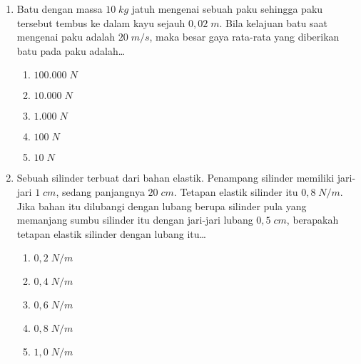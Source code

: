 \documentclass[A4,12PT, english, twocolumn]{journal}
\begin{document}
\begin{enumerate}
\item Batu dengan massa $10 \; kg$ jatuh mengenai sebuah paku sehingga paku tersebut tembus ke dalam kayu sejauh $0,02 \; m$. Bila kelajuan batu saat mengenai paku adalah $20 \; m/s$, maka besar gaya rata-rata yang diberikan batu pada paku adalah\dots
    \begin{enumerate}
        \item $100.000 \; N$
        \item $10.000 \; N$
        \item $1.000 \; N$
        \item $100 \; N$
        \item $10\; N$
    \end{enumerate}
   
\item Sebuah silinder terbuat dari bahan elastik. Penampang silinder memiliki jari-jari $1 \; cm$, sedang panjangnya $20 \; cm$. Tetapan elastik silinder itu $0,8 \; N/m$. Jika bahan itu dilubangi dengan lubang berupa silinder pula yang memanjang sumbu silinder itu dengan jari-jari lubang $0,5 \; cm$, berapakah tetapan elastik silinder dengan lubang itu\dots
    \begin{enumerate}
        \item $0,2 \; N/m$
        \item $0,4 \; N/m$
        \item $0,6 \; N/m$
        \item $0,8 \; N/m$
        \item $1,0 \; N/m$
    \end{enumerate}


\end{enumerate}
\end{document}
